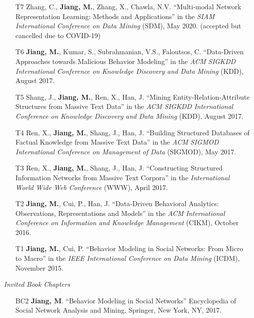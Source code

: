 \documentclass[10pt]{article}
\newenvironment{myindentpar}[1]%
{\begin{list}{}%
         {\setlength{\leftmargin}{#1}}%
         \item[]%
}
{\end{list}}
\newcounter{list}
\begin{document}
\begin{myindentpar}{0.00cm}
\begin{enumerate}[leftmargin=.5cm]
\item[T7] Zhang, C., \textbf{Jiang, M.}, Zhang, X., Chawla, N.V. ``Multi-modal Network Representation Learning: Methods and Applications'' in the \textit{SIAM International Conference on Data Mining} (SDM), May 2020. (accepted but cancelled due to COVID-19)

\item[T6] \textbf{Jiang, M.}, Kumar, S., Subrahmanian, V.S., Faloutsos, C. ``Data-Driven Approaches towards Malicious Behavior Modeling'' in the \textit{ACM SIGKDD International Conference on Knowledge Discovery and Data Mining} (KDD), August 2017.

\item[T5] Shang, J., \textbf{Jiang, M.}, Ren, X., Han, J. ``Mining Entity-Relation-Attribute Structures from Massive Text Data'' in the \textit{ACM SIGKDD International Conference on Knowledge Discovery and Data Mining} (KDD), August 2017.

\item[T4] Ren, X., \textbf{Jiang, M.}, Shang, J., Han, J. ``Building Structured Databases of Factual Knowledge from Massive Text Data'' in the \textit{ACM SIGMOD International Conference on Management of Data} (SIGMOD), May 2017.
		
\item[T3] Ren, X., \textbf{Jiang, M.}, Shang, J., Han, J. ``Constructing Structured Information Networks from Massive Text Corpora'' in the \textit{International World Wide Web Conference}  (WWW), April 2017.

\item[T2] \textbf{Jiang, M.}, Cui, P., Han, J. ``Data-Driven Behavioral Analytics: Observations, Representations and Models'' in the \textit{ACM International Conference on Information and Knowledge Management} (CIKM), October 2016.
		
\item[T1] \textbf{Jiang, M.}, Cui, P. ``Behavior Modeling in Social Networks: From Micro to Macro'' in the \textit{IEEE International Conference on Data Mining} (ICDM), November 2015.

\end{enumerate}

\hspace{-0.25cm}\textit{Invited Book Chapters}

\begin{enumerate}[leftmargin=.5cm]

\item[BC2] \textbf{Jiang, M}. ``Behavior Modeling in Social Networks'' Encyclopedia of Social Network Analysis and Mining, Springer, New York, NY, 2017.
		

\end{enumerate}
\end{myindentpar}
\end{document}
